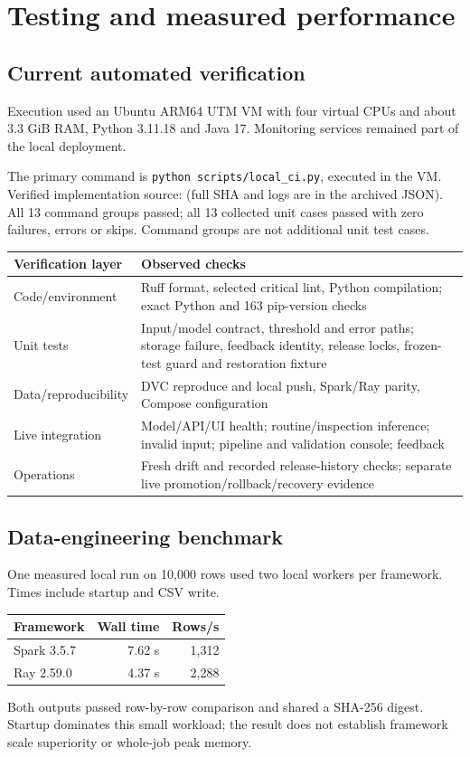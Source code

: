 \documentclass[11pt,a4paper]{article}
\newcommand{\file}[1]{\path{#1}}
\begin{document}
\section{Testing and measured performance}
\subsection{Current automated verification}
Execution used an Ubuntu ARM64 UTM VM with four virtual CPUs and about 3.3 GiB RAM, Python 3.11.18 and Java 17. Monitoring services remained part of the local deployment.

The primary command is \texttt{python scripts/local\_ci.py}, executed in the VM. Verified implementation source: \file{b77b44db} (full SHA and logs are in the archived JSON). All 13 command groups passed; all 13 collected unit cases passed with zero failures, errors or skips. Command groups are not additional unit test cases.
\par
\begin{tabularx}{\linewidth}{@{}lY@{}}\toprule
Verification layer & Observed checks \\\midrule
Code/environment & Ruff format, selected critical lint, Python compilation; exact Python and 163 pip-version checks \\
Unit tests & Input/model contract, threshold and error paths; storage failure, feedback identity, release locks, frozen-test guard and restoration fixture \\
Data/reproducibility & DVC reproduce and local push, Spark/Ray parity, Compose configuration \\
Live integration & Model/API/UI health; routine/inspection inference; invalid input; pipeline and validation console; feedback \\
Operations & Fresh drift and recorded release-history checks; separate live promotion/rollback/recovery evidence \\\bottomrule
\end{tabularx}
\par
\subsection{Data-engineering benchmark}
One measured local run on 10,000 rows used two local workers per framework. Times include startup and CSV write.
\par
\begin{tabularx}{\linewidth}{@{}Yrr@{}}\toprule
Framework & Wall time & Rows/s \\\midrule
Spark 3.5.7 & 7.62 s & 1,312 \\
Ray 2.59.0 & 4.37 s & 2,288 \\\bottomrule
\end{tabularx}
\par
Both outputs passed row-by-row comparison and shared a SHA-256 digest. Startup dominates this small workload; the result does not establish framework scale superiority or whole-job peak memory.
\end{document}
